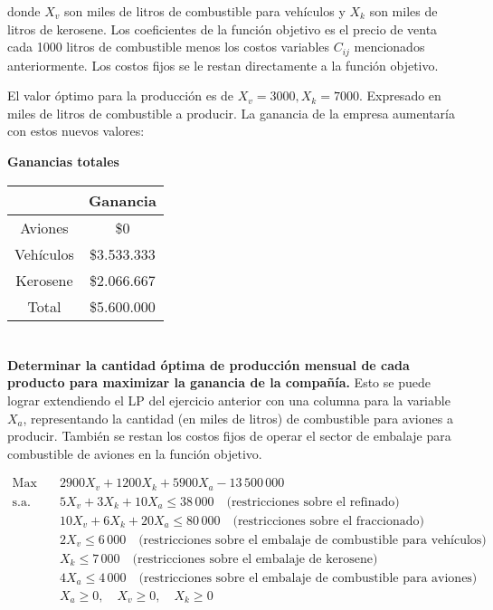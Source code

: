 \documentclass[10pt,a4paper]{article}
\begin{document}
	donde $X_v$ son miles de litros de combustible para vehículos y  $X_k$ son miles de litros de kerosene. Los coeficientes de la función objetivo es el precio de venta cada 1000 litros de combustible menos los costos variables $C_{ij}$ mencionados anteriormente. Los costos fijos se le restan directamente a la función objetivo.
	
	El valor óptimo para la producción es de $X_v = 3000, X_k = 7000$. Expresado en miles de litros de combustible a producir. La ganancia de la empresa aumentaría con estos nuevos valores:
	\clearpage
	\begin{center}
		\textbf{Ganancias totales}
		\vspace{3mm}
		
		\begin{tabular}{| c | c |}
			\hline
			&           Ganancia    \\
			\hline
			Aviones   & \$0  \\
			\hline
			Vehículos & \$3.533.333 \\
			\hline
			Kerosene  & \$2.066.667 \\
			\hline
			Total     & \$5.600.000\\
			\hline
		\end{tabular}
	\end{center}
	
	\section{} %
	\textbf{Determinar la cantidad óptima de producción mensual de cada producto para maximizar la ganancia de la compañía.}
	Esto se puede lograr extendiendo el LP del ejercicio anterior con una columna para la variable $X_a$, representando la cantidad (en miles de litros) de combustible para aviones a producir. También se restan los costos fijos de operar el sector de embalaje para combustible de aviones en la función objetivo.
	
	\begin{align*}
		\text{Max} \quad & 2900 X_v + 1200 X_k + 5900 X_a  - 13\,500\,000 \\
		\text{s.a.} \quad
		& 5 X_v + 3 X_k + 10 X_a \leq 38\,000 \quad \text{(restricciones sobre el refinado)} \\
		& 10 X_v + 6 X_k + 20 X_a \leq 80\,000 \quad \text{(restricciones sobre el fraccionado)} \\
		& 2 X_v \leq 6\,000 \quad \text{(restricciones sobre el embalaje de combustible para vehículos)}\\
		& X_k \leq 7\,000 \quad \text{(restricciones sobre el embalaje de kerosene)}\\
		& 4 X_a \leq 4\,000 \quad \text{(restricciones sobre el embalaje de combustible para aviones)} \\
		& X_a \geq 0,\quad X_v \geq 0,\quad X_k \geq 0
	\end{align*}
	
\end{document}

